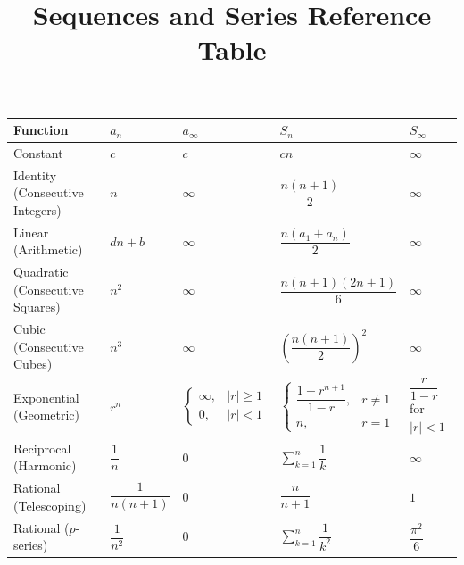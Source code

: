 \documentclass[12pt]{article}
\title{Sequences and Series Reference Table}
\author{}
\date{}
\begin{document}
\maketitle

\renewcommand{\arraystretch}{1.3}
\begin{table}[h]
\centering
\scriptsize
\setlength{\tabcolsep}{4pt}
\begin{tabular}{|>{\raggedright\arraybackslash}p{2.35in}|>{\centering\arraybackslash}p{0.85in}|>{\centering\arraybackslash}p{0.85in}|>{\centering\arraybackslash}p{1.05in}|>{\centering\arraybackslash}p{0.9in}|}
\hline
\textbf{Function} & \textbf{$a_n$} & \textbf{$a_\infty$} & \textbf{$S_n$} & \textbf{$S_\infty$} \\
\hline
Constant & $c$ & $c$ & $c n$ & $\infty$ \\
\hline
Identity (Consecutive Integers) & $n$ & $\infty$ & $\dfrac{n(n+1)}{2}$ & $\infty$ \\
\hline
Linear (Arithmetic) & $d n + b$ & $\infty$ & $\dfrac{n(a_1+a_n)}{2}$ & $\infty$ \\
\hline
Quadratic (Consecutive Squares) & $n^2$ & $\infty$ & $\dfrac{n(n+1)(2n+1)}{6}$ & $\infty$ \\
\hline
Cubic (Consecutive Cubes) & $n^3$ & $\infty$ & $\left(\dfrac{n(n+1)}{2}\right)^2$ & $\infty$ \\
\hline
Exponential (Geometric) & $r^n$ &
$\begin{cases}
\infty, & |r|\ge 1 \\
0, & |r|<1
\end{cases}$ &
$\begin{cases}
\dfrac{1-r^{n+1}}{1-r}, & r\ne 1 \\
n, & r=1
\end{cases}$ &
$\dfrac{r}{1-r}$ for $|r|<1$ \\
\hline
Reciprocal (Harmonic) & $\dfrac{1}{n}$ & $0$ & $\displaystyle\sum_{k=1}^{n}\dfrac{1}{k}$ & $\infty$ \\
\hline
Rational (Telescoping) & $\dfrac{1}{n(n+1)}$ & $0$ & $\dfrac{n}{n+1}$ & $1$ \\
\hline
Rational ($p$-series) & $\dfrac{1}{n^2}$ & $0$ & $\displaystyle\sum_{k=1}^{n}\dfrac{1}{k^2}$ & $\dfrac{\pi^2}{6}$ \\
\hline
\end{tabular}
\end{table}
\end{document}
